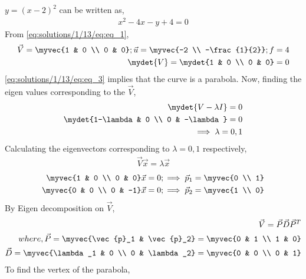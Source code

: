 $y=(x-2)^2$ can be written as,
\begin{align} \label{eq:solutions/1/13/eq:eq_1}
    x^2-4x-y+4=0
\end{align}
From \eqref{eq:solutions/1/13/eq:eq_1}, 
\begin{align} 
    \vec{V} = \myvec{1 & 0 \\ 0 & 0};\vec{u} = \myvec{-2 \\ -\frac{1}{2}};f=4 \label{eq:solutions/1/13/eq:eq_2} \\
    \mydet{V} = \mydet{1 & 0 \\ 0 & 0} = 0 \label{eq:solutions/1/13/eq:eq_3}
\end{align}
\eqref{eq:solutions/1/13/eq:eq_3} implies that the curve is a parabola. Now, finding the eigen values corresponding to the $\vec{V}$,
\begin{align}
    \mydet{V-\lambda I} = 0 \nonumber \\
    \mydet{1-\lambda & 0 \\ 0 & -\lambda} = 0 \nonumber \\
    \implies \lambda=0,1 \label{eq:solutions/1/13/eq:eq_4}
\end{align}
Calculating the eigenvectors corresponding to $\lambda=0,1$ respectively,
\begin{align}
    \vec{V}\vec{x} = \lambda\vec{x} \nonumber 
\end{align}
\begin{align}
    \myvec{1 & 0 \\ 0 & 0}\vec{x} = 0;\implies \vec{p}_1 = \myvec{0 \\ 1} \label{eq:solutions/1/13/eq:eq_5} \\
    \myvec{0 & 0 \\ 0 & -1}\vec{x} = 0;\implies \vec{p}_2 = \myvec{1 \\ 0} \label{eq:solutions/1/13/eq:eq_6}
\end{align}
By Eigen decomposition on $\vec{V}$,
\begin{align}
    \vec{V} = \vec{P}\vec{D}\vec{P}^T \nonumber \\
    where, \vec{P} = \myvec{\vec{p}_1 & \vec{p}_2} = \myvec{0 & 1 \\ 1 & 0} \label{eq:solutions/1/13/eq:eq_7} \\
    \vec{D} = \myvec{\lambda_1 & 0 \\ 0 & \lambda_2} = \myvec{0 & 0 \\ 0 & 1} \label{eq:solutions/1/13/eq:eq_8}
\end{align}
To find the vertex of the parabola,
